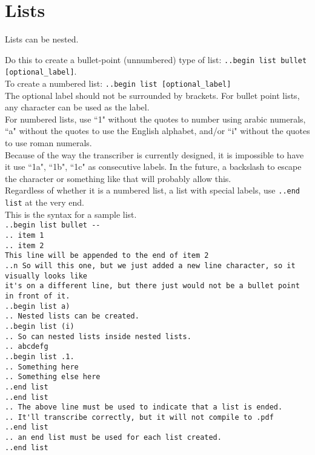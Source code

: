 \documentclass[12pt]{article}
\newcommand{\nl}{\\}
\numberwithin{equation}{section}
\begin{document}
\section{Lists}

Lists can be nested.

Do this to create a bullet-point (unnumbered) type of list: \verb|..begin list bullet [optional_label]|.\nl
To create a numbered list: \verb|..begin list [optional_label]|\nl
The optional label should not be surrounded by brackets. For bullet point lists, any character can be used as the label. \nl
For numbered lists, use ``1" without the quotes to number using arabic numerals, ``a" without the quotes to use the English alphabet, and/or ``i" without the quotes to use roman numerals. \nl
Because of the way the transcriber is currently designed, it is impossible to have it use ``1a", ``1b", ``1c" as consecutive labels. In the future, a backslash to escape the character or something like that will probably allow this. \nl
Regardless of whether it is a numbered list, a list with special labels, use \verb|..end list| at the very end. \nl
\bigskip
This is the syntax for a sample list. \nl
\verb|..begin list bullet --|\nl
\verb|.. item 1|\nl
\verb|.. item 2|\nl
\verb|This line will be appended to the end of item 2|\nl
\verb|..n So will this one, but we just added a new line character, so it visually looks like|\nl
\verb|it's on a different line, but there just would not be a bullet point in front of it.|\nl
\verb|..begin list a)|\nl
\verb|.. Nested lists can be created.|\nl
\verb|..begin list (i)|\nl
\verb|.. So can nested lists inside nested lists.|\nl
\verb|.. abcdefg|\nl
\verb|..begin list .1.|\nl
\verb|.. Something here|\nl
\verb|.. Something else here|\nl
\verb|..end list|\nl
\verb|..end list|\nl
\verb|.. The above line must be used to indicate that a list is ended.|\nl
\verb|.. It'll transcribe correctly, but it will not compile to .pdf|\nl
\verb|..end list|\nl
\verb|.. an end list must be used for each list created.|\nl
\verb|..end list|\nl
\bigskip
\end{document}
